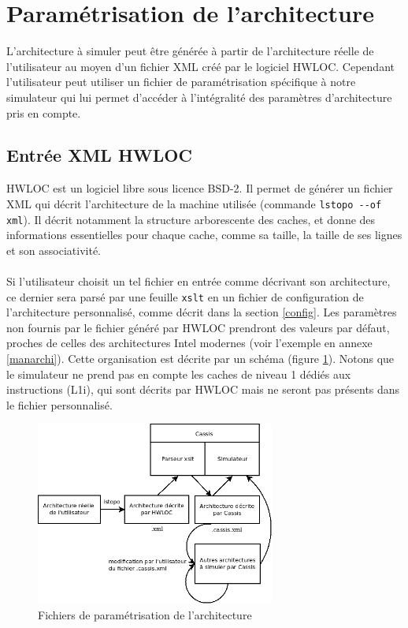 \section{Paramétrisation de l'architecture}

\label{param_xml}
L'architecture à simuler peut être générée à partir de l'architecture réelle de l'utilisateur au moyen d'un fichier XML créé par le logiciel \textsf{HWLOC}. Cependant l'utilisateur peut utiliser un fichier de paramétrisation spécifique à notre simulateur qui lui permet d'accéder à l'intégralité des paramètres d'architecture pris en compte.

\subsection{Entrée XML HWLOC}

\textsf{HWLOC} est un logiciel libre sous licence BSD-2. Il permet de générer un fichier XML qui décrit l'architecture de la machine utilisée (commande \verb?lstopo --of xml?). Il décrit notamment la structure arborescente des caches, et donne des informations essentielles pour chaque cache, comme sa taille, la taille de ses lignes et son associativité. 

\paragraph{}
Si l'utilisateur choisit un tel fichier en entrée comme décrivant son architecture, ce dernier sera parsé par une feuille \texttt{xslt} en un fichier de configuration de l'architecture personnalisé, comme décrit dans la section \ref{config}. Les paramètres non fournis par le fichier généré par \textsf{HWLOC} prendront des valeurs par défaut, proches de celles des architectures \textsf{Intel} modernes (voir l'exemple en annexe \ref{manarchi}). Cette organisation est décrite par un schéma (figure \ref{img:archi}). Notons que le simulateur ne prend pas en compte les caches de niveau 1 dédiés aux instructions (L1i), qui sont décrits par \textsf{HWLOC} mais ne seront pas présents dans le fichier personnalisé.

\begin{figure}[!h]
\begin{center}
   \includegraphics[width=0.7\textwidth]{images/schema_archi.png}
   \caption{\label{img:archi} Fichiers de paramétrisation de l'architecture}
\end{center}
\end{figure}

